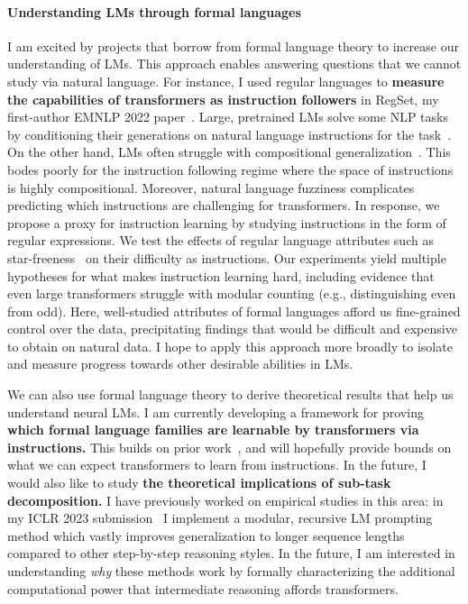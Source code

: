 \documentclass[11pt]{article}
\begin{document}
\paragraph{Understanding LMs through formal languages}

I am excited by projects 
that borrow from formal language theory
to increase our understanding of LMs.
This approach enables answering 
questions that we cannot study via natural language.
For instance, I used regular languages to 
\textbf{measure the capabilities of transformers as instruction followers}
in RegSet, my first-author EMNLP 2022 paper~\cite{Finlayson2022WhatMI}. 
Large, pretrained LMs solve some NLP tasks 
by conditioning their generations on natural language instructions 
for the task~\cite{mishra2021crosstask, Wei2021FinetunedLM}. 
On the other hand, LMs often struggle with
compositional generalization~\cite{Lake2018GeneralizationWS}. 
This bodes poorly for the instruction following regime
where the space of instructions is highly compositional.
Moreover, natural language fuzziness complicates predicting
which instructions are challenging for transformers.
In response, we propose a proxy for instruction learning
by studying instructions in the form of regular expressions.
We test the effects of regular language attributes
such as star-freeness~\cite{Salomaa1981JewelsOF}
on their difficulty as instructions.
Our experiments yield multiple hypotheses 
for what makes instruction learning hard, 
including evidence that even large transformers 
struggle with modular counting 
(e.g., distinguishing even from odd). 
Here, well-studied attributes of formal languages afford us 
fine-grained control over the data, 
precipitating findings that would be difficult and expensive 
to obtain on natural data.
I hope to apply this approach more broadly 
to isolate and measure progress towards other desirable abilities in LMs. 

We can also use formal language theory to derive theoretical results 
that help us understand neural LMs. 
I am currently developing a framework for 
proving \textbf{which formal language families 
are learnable by transformers via instructions.}
This builds on prior work~\cite{Merrill2022LogPrecisionTA},
and will hopefully provide bounds 
on what we can expect transformers to learn from instructions.
In the future, I would also like to study
\textbf{the theoretical implications of sub-task decomposition.}
I have previously worked on empirical studies in this area:
in my ICLR 2023 submission~\cite{Khot2022DecomposedPA}
I implement a modular, recursive LM prompting method
which vastly improves generalization to longer sequence lengths 
compared to other step-by-step reasoning styles.
In the future, I am interested in understanding \emph{why} these methods work 
by formally characterizing the additional computational power 
that intermediate reasoning affords transformers.
\end{document}
